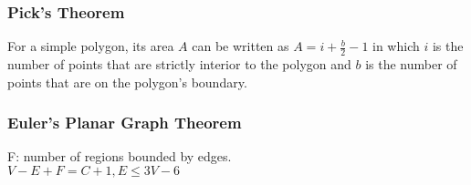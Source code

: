 \subsubsection{Pick's Theorem}
For a simple polygon, its area $A$ can be written as $A = i + \frac b2 - 1$ in which $i$ is the number of points that are strictly interior to the polygon and $b$ is the number of points that are on the polygon's boundary.
\subsubsection{Euler's Planar Graph Theorem}
F: number of regions bounded by edges. \\
\(V - E + F = C + 1, E \le 3V - 6\)
